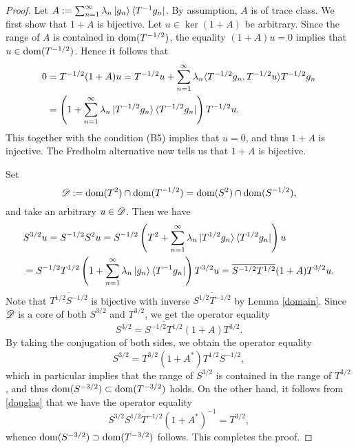 \documentclass[12pt]{article}
\theoremstyle{plain}
\numberwithin{equation}{section}
\theoremstyle{remark}
\begin{document}
\begin{proof}
Let $A:=\sum_{n=1}^\infty\lambda_n\ket{g_n}\bra{T^{-1}g_n}$.
By assumption, $A$ is of trace class.
We first show that $1+A$ is bijective.
Let $u\in\ker(1+A)$ be arbitrary.
Since the range of $A$ is contained in $\mathop{\mathrm{dom}}(T^{-1/2})$, the equality $(1+A)u=0$ implies that $u\in\mathop{\mathrm{dom}}(T^{-1/2})$.
Hence it follows that
\begin{align*}
0 &= T^{-1/2}(1+A)u = T^{-1/2}u + \sum_{n=1}^\infty\lambda_n\langle T^{-1/2}g_n,T^{-1/2}u\rangle T^{-1/2}g_n\\
&=\left(1+\sum_{n=1}^\infty\lambda_n\ket{T^{-1/2}g_n}\bra{T^{-1/2}g_n}\right)T^{-1/2}u.
\end{align*}
This together with the condition (B5) implies that $u=0$, and thus $1+A$ is injective.
The Fredholm alternative now tells us that $1+A$ is bijective. 

Set
\[
\mathscr{D} :=\mathop{\mathrm{dom}}(T^2)\cap\mathop{\mathrm{dom}}(T^{-1/2})=\mathop{\mathrm{dom}}(S^2)\cap\mathop{\mathrm{dom}}(S^{-1/2}),
\]
and take an arbitrary $u\in\mathscr{D} $.
Then we have
\begin{align*}
&S^{3/2}u=S^{-1/2}S^2u=S^{-1/2}\left(T^2+\sum_{n=1}^\infty\lambda_n\ket{T^{1/2}g_n}\bra{T^{1/2}g_n}\right)u\\
&=S^{-1/2}T^{1/2}\left(1+\sum_{n=1}^\infty\lambda_n\ket{g_n}\bra{T^{-1}g_n}\right)T^{3/2}u
=\overline{S^{-1/2}T^{1/2}}(1+A)T^{3/2}u.
\end{align*}
Note that $\overline{T^{1/2}S^{-1/2}}$ is bijective with inverse $\overline{S^{1/2}T^{-1/2}}$ by Lemma \ref{domain}.
Since $\mathscr{D} $ is a core of both $S^{3/2}$ and $T^{3/2}$, 
we get the operator equality
\[
S^{3/2} = \overline{S^{-1/2}T^{1/2}}(1+A)T^{3/2}.
\]
By taking the conjugation of both sides, we obtain the operator equality
\begin{equation}\label{douglas}
S^{3/2} = T^{3/2}(1+A^*)\overline{T^{1/2}S^{-1/2}},
\end{equation}
which in particular implies that the range of $S^{3/2}$ is contained in the range of $T^{3/2}$,
and thus $\mathop{\mathrm{dom}}(S^{-3/2})\subset\mathop{\mathrm{dom}}(T^{-3/2})$ holds.
On the other hand, it follows from \eqref{douglas} that we have the operator equality
\[
S^{3/2}\overline{S^{1/2}T^{-1/2}}(1+A^*)^{-1} = T^{3/2},
\]
whence $\mathop{\mathrm{dom}}(S^{-3/2})\supset\mathop{\mathrm{dom}}(T^{-3/2})$ follows.
This completes the proof.
\end{proof}
\end{document}
